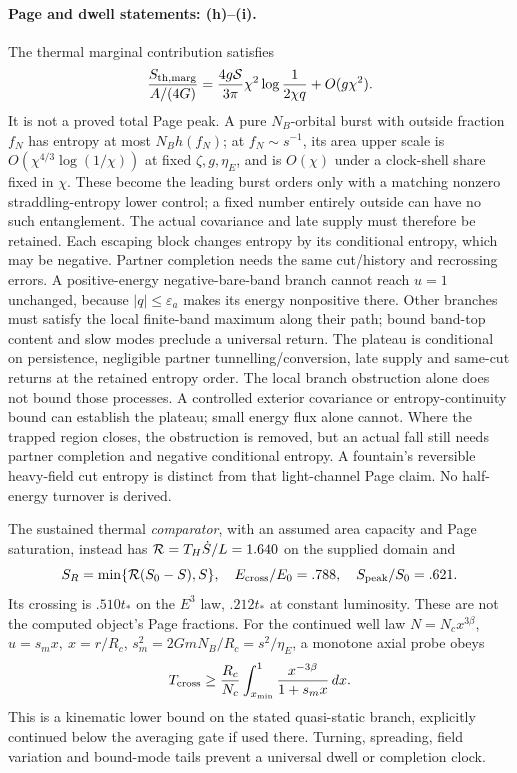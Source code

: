 \documentclass[10pt]{article}
\begin{document}
\paragraph{Page and dwell statements: (h)--(i).}
The thermal marginal contribution satisfies
\[
 \frac{S_{\rm th,marg}}{A/(4G)}
 =\frac{4g\mathcal S}{3\pi}\chi^2
       \log\frac1{2\chi q}+O(g\chi^2).
\]
It is not a proved total Page peak. A pure \(N_B\)-orbital
burst with outside fraction \(f_N\) has entropy at most
\(N_Bh(f_N)\); at \(f_N\sim s^{-1}\), its area upper
scale is \(O(\chi^{4/3}\log(1/\chi))\) at fixed
\(\zeta,g,\eta_E\), and is \(O(\chi)\) under a
clock-shell share fixed in \(\chi\). These become the
leading burst orders only with a matching nonzero
straddling-entropy lower control; a fixed number entirely
outside can have no such entanglement. The actual covariance
and late supply must therefore be retained. Each
escaping block changes entropy by its conditional
entropy, which may be negative. Partner completion
needs the same cut/history and recrossing errors.
A positive-energy negative-bare-band branch cannot
reach \(u=1\) unchanged, because \(|q|\le\varepsilon_a\)
makes its energy nonpositive there. Other branches
must satisfy the local finite-band maximum along
their path; bound band-top content and slow modes
preclude a universal return.
The plateau is conditional on persistence, negligible
partner tunnelling/conversion, late supply and same-cut
returns at the retained entropy order. The local branch
obstruction alone does not bound those processes. A
controlled exterior covariance or entropy-continuity bound
can establish the plateau; small energy flux alone cannot.
Where the trapped region closes, the obstruction is
removed, but an actual fall still needs partner completion
and negative conditional entropy. A fountain's reversible
heavy-field cut entropy is distinct from that light-channel
Page claim. No half-energy turnover is derived.

The sustained thermal \emph{comparator}, with an
assumed area capacity and Page saturation, instead
has \({\cal R}=T_H\dot S/L=1.640\) on the supplied
domain and
\[
 S_R=\min\{{\cal R}(S_0-S),S\},\quad
 E_{\rm cross}/E_0=.788,\quad S_{\rm peak}/S_0=.621 .
\]
Its crossing is \(.510t_*\) on the \(E^3\) law,
\(.212t_*\) at constant luminosity. These are not
the computed object's Page fractions.
For the continued well law \(N=N_cx^{3\beta}\),
\(u=s_mx,\ x=r/R_c\),
\(s_m^2=2GmN_B/R_c=s^2/\eta_E\), a monotone axial probe obeys
\[
 T_{\rm cross}\ge\frac{R_c}{N_c}
 \int_{x_{\min}}^1\frac{x^{-3\beta}}{1+s_mx}\,dx .
\]
This is a kinematic lower bound on the stated
quasi-static branch, explicitly continued below
the averaging gate if used there. Turning,
spreading, field variation and bound-mode tails
prevent a universal dwell or completion clock.
\end{document}
